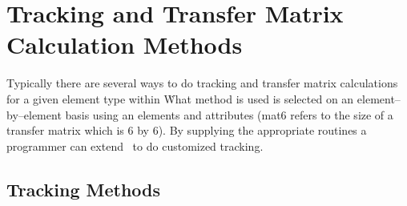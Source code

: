 \chapter{Tracking and Transfer Matrix Calculation Methods}

Typically there are several ways to do tracking and transfer matrix
calculations for a given element type within \bmad\. What method is used
is selected on an element--by--element basis using
an elements  and  attributes 
(mat6 refers to the size of a transfer matrix which is 6 by 6). By supplying
the appropriate routines a programmer can extend \bmad\ to do customized 
tracking.

\section{Tracking Methods}
\label{s:tm}

